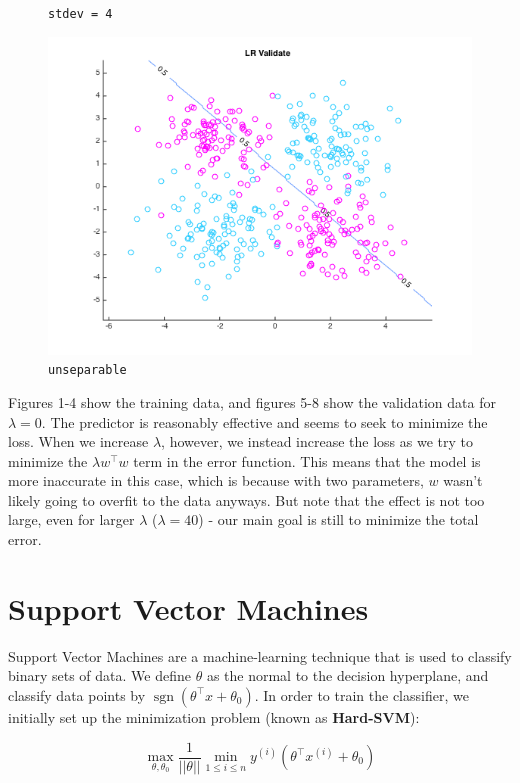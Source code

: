\documentclass[10pt,letterpaper]{article}
\DeclareMathOperator{\sign}{sgn}
\begin{document}
\begin{figure}[!htb]
  \caption{\texttt{stdev = 4}}\label{fig:gradDifS}
\endminipage\hfill
{}
  \includegraphics[width=\linewidth]{figures/sdnv20.png}
  \caption{\texttt{unseparable}}\label{fig:gradDifS}
\endminipage

\end{figure}

Figures 1-4 show the training data, and figures 5-8 show the validation data for $\lambda = 0$. The predictor is reasonably effective and seems to seek to minimize the loss. When we increase $\lambda$, however, we instead increase the loss as we try to minimize the $\lambda w^\intercal w$ term in the error function. This means that the model is more inaccurate in this case, which is because with two parameters, $w$ wasn't likely going to overfit to the data anyways. But note that the effect is not too large, even for larger $\lambda$ ($\lambda = 40$) - our main goal is still to minimize the total error.

\section{Support Vector Machines}
Support Vector Machines are a machine-learning technique that is used to classify binary sets of data. We define $\theta$ as the normal to the decision hyperplane, and classify data points by $\sign (\theta^\intercal x + \theta_0)$. In order to train the classifier, we initially set up the minimization problem (known as \textbf{Hard-SVM}):

\begin{equation}
\max_{\theta, \theta_0} \dfrac{1}{||\theta||} \min_{1 \le i \le n} y^{(i)} (\theta^\intercal x^{(i)} + \theta_0)
\end{equation}
\end{document}
